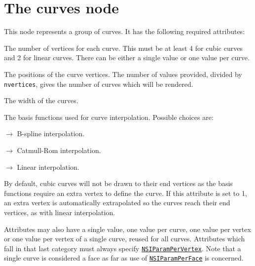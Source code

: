 \documentclass[oneside,ebook]{memoir}
\newcommand{\paramlistitemTN}[2]{\item[#2\textcolor{lightgray}{\dotfill}#1]}
\newcommand{\paramlistitemTND}[3]{\paramlistitemTN{#1 {\rmfamily({\ttfamily#3})}}{#2}}
\newcommand{\paramvalueitem}[1]{\item[#1]$\rightarrow$}
\begin{document}
\section{The curves node}
\label{section:curvesnode}
This node represents a group of curves. It has the following required attributes:
\begin{paramlist}
\paramlistitemTN{int}{nvertices}
The number of vertices for each curve. This must be at least 4 for cubic curves and 2 for linear curves. There can be either a single value or one value per curve.
\paramlistitemTN{point}{P}
The positions of the curve vertices.
The number of values provided, divided by \lstinline|nvertices|, gives the number of curves which will be rendered.
\paramlistitemTN{float}{width}
The width of the curves.
\paramlistitemTND{string}{basis}{catmull-rom}
The basis functions used for curve interpolation. Possible choices are:
\begin{paramvaluelist}
\paramvalueitem{b-spline}
B-spline interpolation.
\paramvalueitem{catmull-rom}
Catmull-Rom interpolation.
\paramvalueitem{linear}
Linear interpolation.
\end{paramvaluelist}
\paramlistitemTND{int}{extrapolate}{0}
By default, cubic curves will not be drawn to their end vertices as the basis functions require an extra vertex to define the curve. If this attribute is set to 1, an extra vertex is automatically extrapolated so the curves reach their end vertices, as with linear interpolation.
\end{paramlist}

Attributes may also have a single value, one value per curve, one value per vertex or one value per vertex of a single curve, reused for all curves.
Attributes which fall in that last category must always specify \hyperref[Interface:parameterflags]{\lstinline|NSIParamPerVertex|}.
Note that a single curve is considered a face as far as use of \hyperref[Interface:parameterflags]{\lstinline|NSIParamPerFace|} is concerned.
\end{document}
